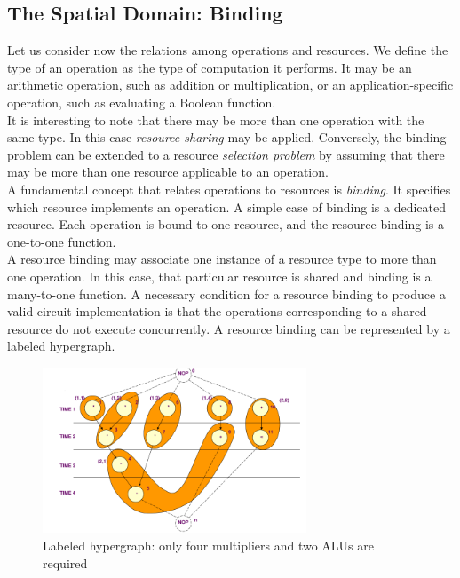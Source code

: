 \subsection{The  Spatial Domain: Binding}
Let us consider now the relations among operations and resources. We define the type  of an operation as the type of computation it performs. It may be an arithmetic operation, such as addition or multiplication, or an application-specific operation, such as evaluating a Boolean function.\\
It is interesting to note that there may be more than one operation with the same type. In this case \textit{resource sharing}  may be applied. Conversely, the binding problem can be extended to a resource \textit{selection problem} by assuming that there may be more than one resource applicable to an operation.\\
A  fundamental concept that relates operations to resources is  \textit{binding}. It specifies which resource implements an operation. A  simple case of binding is  a  dedicated resource. Each operation is bound to
one resource, and the resource binding is  a  one-to-one function.\\
A  resource binding may associate one instance of a resource type to more than one operation. In this case, that particular resource is  shared  and binding is a many-to-one function.  A  necessary condition for  a  resource binding to produce a valid circuit implementation is that the operations corresponding to a shared resource do not execute concurrently. A  resource binding can  be  represented by a  labeled hypergraph.
\begin{figure}[H]
	 \centering
	 \includegraphics[width=0.7\textwidth]{./Cap3/Images/Image21.png}
	 \caption[Optional caption]{Labeled hypergraph:  only four multipliers and two  ALUs  are required}
	 \label{fig:hypergraph}
\end{figure}

